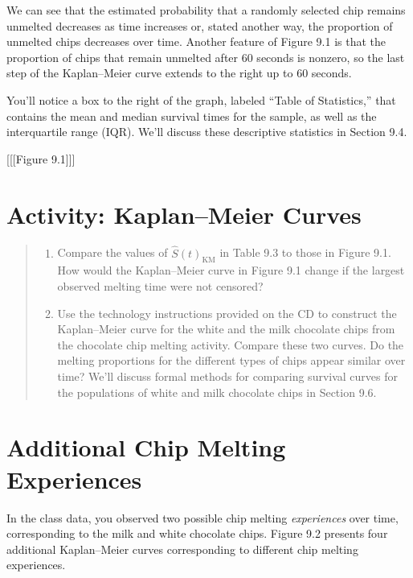 \documentclass[
]{report}
\providecommand{\tightlist}{%
  \setlength{\itemsep}{0pt}\setlength{\parskip}{0pt}}
\begin{document}
We can see that the estimated probability that a randomly selected chip remains unmelted decreases as time increases or, stated another way, the proportion of unmelted chips decreases over time. Another feature of Figure 9.1 is that the proportion of chips that remain unmelted after 60 seconds is nonzero, so the last step of the Kaplan--Meier curve extends to the right up to 60 seconds.

You'll notice a box to the right of the graph, labeled ``Table of Statistics,'' that contains the mean and
median survival times for the sample, as well as the interquartile range (IQR). We'll discuss these descriptive
statistics in Section 9.4.

{[}{[}{[}Figure 9.1{]}{]}{]}

\section*{Activity: Kaplan--Meier Curves}\label{activity-kaplanmeier-curves}

\begin{quote}
\begin{enumerate}
\def\labelenumi{\arabic{enumi}.}
\setcounter{enumi}{17}
\tightlist
\item
  Compare the values of \(\hat S(t)_{\mathrm{KM}}\) in Table 9.3 to those in Figure 9.1. How would the Kaplan--Meier curve in Figure 9.1 change if the largest observed melting time were not censored?\\
\item
  Use the technology instructions provided on the CD to construct the Kaplan--Meier curve for the white and the milk chocolate chips from the chocolate chip melting activity. Compare these two curves. Do the melting proportions for the different types of chips appear similar over time? We'll discuss formal methods for comparing survival curves for the populations of white and milk chocolate chips in Section 9.6.
\end{enumerate}
\end{quote}

\section*{Additional Chip Melting Experiences}\label{additional-chip-melting-experiences}

In the class data, you observed two possible chip melting \emph{experiences} over time, corresponding to the milk and white chocolate chips. Figure 9.2 presents four additional Kaplan--Meier curves corresponding to different chip melting experiences.
\end{document}
